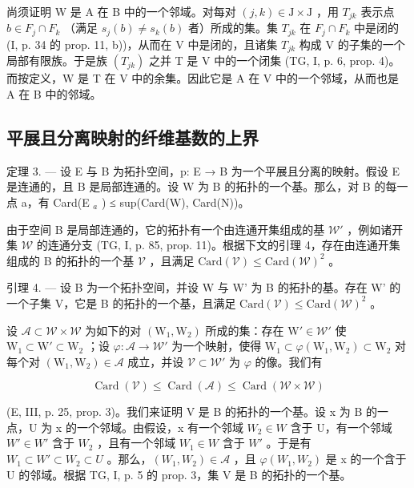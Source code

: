 尚须证明 W 是 A 在 B 中的一个邻域。对每对 \((j,k)\in\mathrm{J}\times\mathrm{J}\) ，用 \(T_{jk}\) 表示点 \(b\in F_{j}\cap F_{k}\) （满足 \(s_{j}(b)\neq s_{k}(b)\) 者）所成的集。集 \(T_{jk}\) 在 \(F_{j}\cap F_{k}\) 中是闭的 (I, p. 34 的 prop. 11, b))，从而在 V 中是闭的，且诸集 \(T_{jk}\) 构成 V 的子集的一个局部有限族。于是族 \((T_{jk})\) 之并 T 是 V 中的一个闭集 (TG, I, p. 6, prop. 4)。而按定义，W 是 T 在 V 中的余集。因此它是 A 在 V 中的一个邻域，从而也是 A 在 B 中的邻域。

\subsection{平展且分离映射的纤维基数的上界}

定理 3. --- 设 E 与 B 为拓扑空间，p: E → B 为一个平展且分离的映射。假设 E 是连通的，且 B 是局部连通的。设 W 为 B 的拓扑的一个基。那么，对 B 的每一点 a，有 Card(E \(_{a}\) ) ≤ sup(Card(W), Card(N))。

由于空间 B 是局部连通的，它的拓扑有一个由连通开集组成的基 \(\mathcal{W}'\) ，例如诸开集 \(\mathcal{W}\) 的连通分支 (TG, I, p. 85, prop. 11)。根据下文的引理 4，存在由连通开集组成的 B 的拓扑的一个基 \(\mathcal{V}\) ，且满足 \(\mathrm{Card}(\mathcal{V}) \leqslant \mathrm{Card}(\mathcal{W})^2\) 。

引理 4. --- 设 B 为一个拓扑空间，并设 W 与 W' 为 B 的拓扑的基。存在 W' 的一个子集 V，它是 B 的拓扑的一个基，且满足 \(\text{Card}(\mathcal{V}) \leqslant \text{Card}(\mathcal{W})^{2}\) 。

设 \(\mathcal{A} \subset \mathcal{W} \times \mathcal{W}\) 为如下的对 \((\mathrm{W}_1, \mathrm{W}_2)\) 所成的集：存在 \(\mathrm{W}' \in \mathcal{W}'\) 使 \(\mathrm{W}_1 \subset \mathrm{W}' \subset \mathrm{W}_2\) ；设 \(\varphi: \mathcal{A} \to \mathcal{W}'\) 为一个映射，使得 \(\mathrm{W}_1 \subset \varphi(\mathrm{W}_1, \mathrm{W}_2) \subset \mathrm{W}_2\) 对每个对 \((\mathrm{W}_1, \mathrm{W}_2) \in \mathcal{A}\) 成立，并设 \(\mathcal{V} \subset \mathcal{W}'\) 为 \(\varphi\) 的像。我们有

\[
\operatorname{Card} (\mathcal {V}) \leqslant \operatorname{Card} (\mathcal {A}) \leqslant \operatorname{Card} (\mathcal {W} \times \mathcal {W})
\]

(E, III, p. 25, prop. 3)。我们来证明 V 是 B 的拓扑的一个基。设 x 为 B 的一点，U 为 x 的一个邻域。由假设，x 有一个邻域 \(W_{2} \in W\) 含于 U，有一个邻域 \(W' \in W'\) 含于 \(W_{2}\) ，且有一个邻域 \(W_{1} \in W\) 含于 \(W'\) 。于是有 \(W_{1} \subset W' \subset W_{2} \subset U\) 。那么，\((W_{1}, W_{2}) \in \mathscr{A}\) ，且 \(\varphi(W_{1}, W_{2})\) 是 x 的一个含于 U 的邻域。根据 TG, I, p. 5 的 prop. 3，集 V 是 B 的拓扑的一个基。

